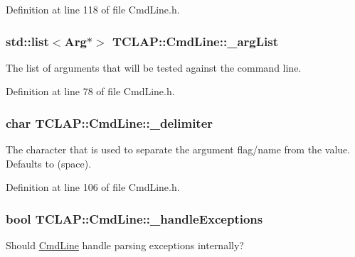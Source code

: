 Definition at line 118 of file Cmd\+Line.\+h.

\hypertarget{class_t_c_l_a_p_1_1_cmd_line_a4d70f73542d8184e077688bff3801baf}{}
\subsubsection[{\+\_\+arg\+List}]{\setlength{\rightskip}{0pt plus 5cm}std\+::list$<${\bf Arg}$\ast$$>$ T\+C\+L\+A\+P\+::\+Cmd\+Line\+::\+\_\+arg\+List\hspace{0.3cm}{\ttfamily [protected]}}\label{class_t_c_l_a_p_1_1_cmd_line_a4d70f73542d8184e077688bff3801baf}
The list of arguments that will be tested against the command line. 

Definition at line 78 of file Cmd\+Line.\+h.

\hypertarget{class_t_c_l_a_p_1_1_cmd_line_a602e65692dc07ea872134f354026a54f}{}
\subsubsection[{\+\_\+delimiter}]{\setlength{\rightskip}{0pt plus 5cm}char T\+C\+L\+A\+P\+::\+Cmd\+Line\+::\+\_\+delimiter\hspace{0.3cm}{\ttfamily [protected]}}\label{class_t_c_l_a_p_1_1_cmd_line_a602e65692dc07ea872134f354026a54f}
The character that is used to separate the argument flag/name from the value. Defaults to \textquotesingle{} \textquotesingle{} (space). 

Definition at line 106 of file Cmd\+Line.\+h.

\hypertarget{class_t_c_l_a_p_1_1_cmd_line_a3609d0c13886053b367d1df80efbe67b}{}
\subsubsection[{\+\_\+handle\+Exceptions}]{\setlength{\rightskip}{0pt plus 5cm}bool T\+C\+L\+A\+P\+::\+Cmd\+Line\+::\+\_\+handle\+Exceptions\hspace{0.3cm}{\ttfamily [protected]}}\label{class_t_c_l_a_p_1_1_cmd_line_a3609d0c13886053b367d1df80efbe67b}
Should \hyperlink{class_t_c_l_a_p_1_1_cmd_line}{Cmd\+Line} handle parsing exceptions internally? 

